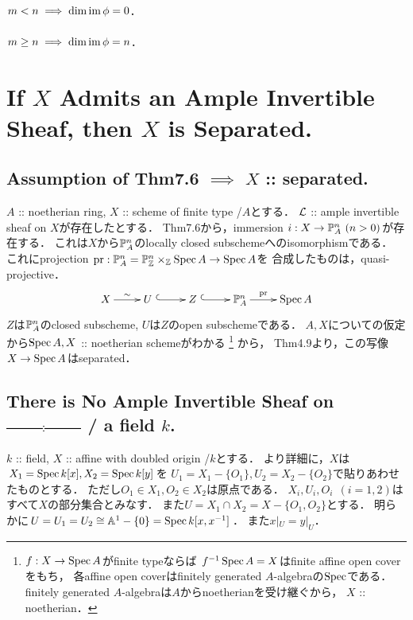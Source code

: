 \documentclass[a4paper]{jsarticle}
\begin{document}
    \paragraph{$m<n \implies \dim \operatorname{im} \phi=0$.}
    \paragraph{$m \geq n \implies \dim \operatorname{im} \phi=n$.}

\section{If $X$ Admits an Ample Invertible Sheaf, then $X$ is Separated.} %
    \subsection{Assumption of Thm7.6 $\implies$ $X$ :: separated.}
    $A$ :: noetherian ring,
    $X$ :: scheme of finite type /$A$とする．
    $\mathcal{L}$ :: ample invertible sheaf on $X$が存在したとする．
    Thm7.6から，immersion $i: X \to \mathbb{P}^n_A ~(n>0)$が存在する．
    これは$X$から$\mathbb{P}^n_A$のlocally closed subschemeへのisomorphismである．
    これにprojection $\operatorname{pr}: \mathbb{P}^n_A=\mathbb{P}^n_{\mathbb{Z}} \times_{\mathbb{Z}} \operatorname{Spec} A \to \operatorname{Spec} A$を
    合成したものは，quasi-projective．
    \[\xymatrix
    {
        X \ar[r]^-{\sim}& U ~\ar@{^{(}->}[r]& Z ~\ar@{^{(}->}[r]& \proj^n_A \ar[r]^-{\pr}& \Spec A
    }\]
    $Z$は$\mathbb{P}^n_A$のclosed subscheme,
    $U$は$Z$のopen subschemeである．
    $A,X$についての仮定から$\operatorname{Spec} A, X$ :: noetherian schemeがわかる
    \footnote
    {
        $f: X \to \operatorname{Spec} A$がfinite typeならば
        $f^{-1}\operatorname{Spec} A=X$はfinite affine open coverをもち，
        各affine open coverはfinitely generated $A$-algebraの$\operatorname{Spec}$である．
        finitely generated $A$-algebraは$A$からnoetherianを受け継ぐから，
        $X$ :: noetherian．
    }
    から，
    Thm4.9より，この写像$X \to \operatorname{Spec} A$はseparated．
    
    \subsection{There is No Ample Invertible Sheaf on 
        \protect\includegraphics[width=2.5cm]{./images/affine_with_doubled_origin.eps} / a field $k$.}
    $k$ :: field,
    $X$ :: affine with doubled origin /$k$とする．
    より詳細に，$X$は$X_1=\operatorname{Spec} k[x], X_2=\operatorname{Spec} k[y]$を
    $U_1=X_1-\{O_1\}, U_2=X_2-\{O_2\}$で貼りあわせたものとする．
    ただし$O_1 \in X_1,O_2 \in X_2$は原点である．
    $X_i, U_i, O_i ~~(i=1,2)$はすべて$X$の部分集合とみなす．
    また$U=X_1 \cap X_2=X-\{O_1, O_2\}$とする．
    明らかに$U=U_1=U_2 \cong \mathbb{A}^1-\{0\}=\operatorname{Spec} k[x, x^{-1}]$．
    また$x|_U=y|_U$．
\end{document}
